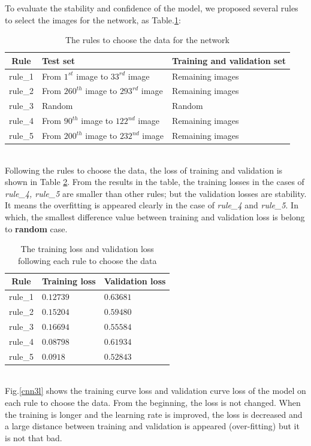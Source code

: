 To evaluate the stability and confidence of the model, we proposed several rules to select the images for the network, as Table.\ref{choosedata}:\\
\begin{table}[h!]
	\centering
	\begin{tabular}{c l l}
	Rule & Test set & Training and validation set \\ \hline
	rule\_1 & From $1^{st}$ image to $33^{rd}$ image & Remaining images \\ \hline
	rule\_2 & From $260^{th}$ image to $293^{rd}$ image & Remaining images\\ \hline
	rule\_3 & Random & Random \\ \hline
	rule\_4 & From $90^{th}$ image to $122^{nd}$ image & Remaining images\\ \hline
	rule\_5 & From $200^{th}$ image to $232^{nd}$ image & Remaining images \\ \hline
	\end{tabular}
	\caption{The rules to choose the data for the network}
	\label{choosedata}
\end{table}~\\
Following the rules to choose the data, the loss of training and validation is shown in Table \ref{losschoosedata}. From the results in the table, the training losses in the cases of \textit{rule\_4, rule\_5} are smaller than other rules; but the validation losses are stability. It means the overfitting is appeared clearly in the case of \textit{rule\_4} and \textit{rule\_5}. In which, the smallest difference value between training and validation loss is belong to \textbf{random} case.
\begin{table}[h!]
	\centering
	\begin{tabular}{c l l}
	Rule & Training loss & Validation loss \\ \hline
	rule\_1 & $0.12739$ & $0.63681$ \\ \hline
	rule\_2 & $0.15204$ & $0.59480$ \\ \hline
	rule\_3 & $0.16694$ & $0.55584$ \\ \hline
	rule\_4 & $0.08798$ & $0.61934$ \\ \hline
	rule\_5 & $0.0918$ & $0.52843$ \\ \hline
	\end{tabular}
	\caption{The training loss and validation loss following each rule to choose the data}
	\label{losschoosedata}
\end{table}~\\[0.1cm]
Fig.\ref{cnn3l} shows the training curve loss and validation curve loss of the model on each rule to choose the data. From the beginning, the loss is not changed. When the training is longer and the learning rate is improved, the loss is decreased and a large distance between training and validation is appeared (over-fitting) but it is not that bad.


